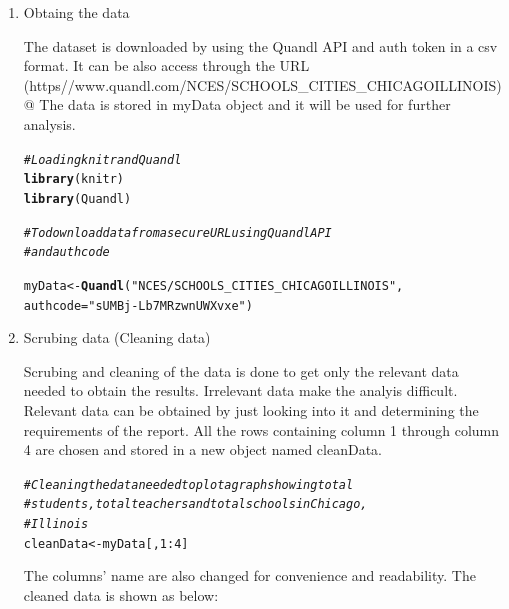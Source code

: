 \documentclass{article}\usepackage[]{graphicx}\usepackage[]{color}
\makeatletter
\newcommand{\hlnum}[1]{\textcolor[rgb]{0.686,0.059,0.569}{#1}}%
\newcommand{\hlstr}[1]{\textcolor[rgb]{0.192,0.494,0.8}{#1}}%
\newcommand{\hlcom}[1]{\textcolor[rgb]{0.678,0.584,0.686}{\textit{#1}}}%
\newcommand{\hlopt}[1]{\textcolor[rgb]{0,0,0}{#1}}%
\newcommand{\hlstd}[1]{\textcolor[rgb]{0.345,0.345,0.345}{#1}}%
\newcommand{\hlkwb}[1]{\textcolor[rgb]{0.69,0.353,0.396}{#1}}%
\newcommand{\hlkwc}[1]{\textcolor[rgb]{0.333,0.667,0.333}{#1}}%
\newcommand{\hlkwd}[1]{\textcolor[rgb]{0.737,0.353,0.396}{\textbf{#1}}}%
\newenvironment{kframe}{%
 \def\at@end@of@kframe{}%
 \ifinner\ifhmode%
  \def\at@end@of@kframe{\end{minipage}}%
  \begin{minipage}{\columnwidth}%
 \fi\fi%
 \def\FrameCommand##1{\hskip\@totalleftmargin \hskip-\fboxsep
 \colorbox{shadecolor}{##1}\hskip-\fboxsep
     \hskip-\linewidth \hskip-\@totalleftmargin \hskip\columnwidth}%
 \MakeFramed {\advance\hsize-\width
   \@totalleftmargin\z@ \linewidth\hsize
   \@setminipage}}%
 {\par\unskip\endMakeFramed%
 \at@end@of@kframe}
\newenvironment{knitrout}{}{} %
\makeatother
\begin{document}
\begin{enumerate}
    \item Obtaing the data

The dataset is downloaded by using the Quandl API and auth token in a csv format.
It can be also access through the URL 
\\\verb@(https//www.quandl.com/NCES/SCHOOLS_CITIES_CHICAGOILLINOIS)@
The data is stored in myData object and it will be used for further analysis.
\begin{knitrout}
\color{fgcolor}\begin{kframe}
\begin{alltt}
\hlcom{# Loading knitr and Quandl}
\hlkwd{library}\hlstd{(knitr)}
\hlkwd{library}\hlstd{(Quandl)}

\hlcom{# To download data from a secure URL using Quandl API }
\hlcom{# and authcode}

\hlstd{myData} \hlkwb{<-} \hlkwd{Quandl}\hlstd{(}\hlstr{"NCES/SCHOOLS_CITIES_CHICAGOILLINOIS"}\hlstd{,}
                 \hlkwc{authcode}\hlstd{=}\hlstr{"sUMBj-Lb7MRzwnUWXvxe"}\hlstd{)}
\end{alltt}
\end{kframe}
\end{knitrout}
\item Scrubing data (Cleaning data)
 
Scrubing and cleaning of the data is done to get only the relevant data needed to obtain the results. Irrelevant data make the analyis difficult. Relevant data can be obtained by just looking into it and determining the requirements of the report. All the rows containing column 1 through column 4 are chosen and stored in a new object named cleanData.

\begin{knitrout}
\color{fgcolor}\begin{kframe}
\begin{alltt}
\hlcom{# Cleaning the data needed to plot a graph showing total }
\hlcom{# students, total teachers and total schools in Chicago, }
\hlcom{# Illinois}
\hlstd{cleanData}\hlkwb{<-}\hlstd{myData[,}\hlnum{1}\hlopt{:}\hlnum{4}\hlstd{]}
\end{alltt}
\end{kframe}
\end{knitrout}
The columns' name are also changed for convenience and readability. The cleaned data is shown as below:



\end{enumerate}
\end{document}
